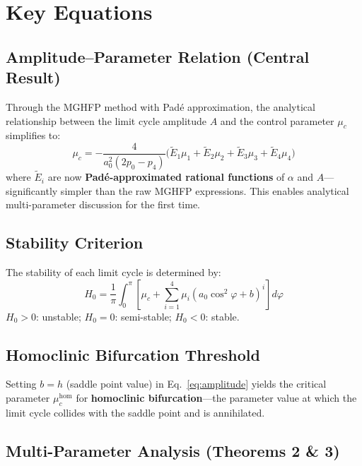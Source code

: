 \documentclass[11pt,a4paper]{article}
\begin{document}
\section{Key Equations}

\subsection{Amplitude--Parameter Relation (Central Result)}

Through the MGHFP method with Pad\'e approximation, the analytical relationship between the limit cycle amplitude $A$ and the control parameter $\mu_c$ simplifies to:
\begin{equation}
\boxed{\mu_c = -\frac{4}{a_0^2(2p_0 - p_4)}\Big(\tilde{E}_1\mu_1 + \tilde{E}_2\mu_2 + \tilde{E}_3\mu_3 + \tilde{E}_4\mu_4\Big)}
\label{eq:amplitude}
\end{equation}
where $\tilde{E}_i$ are now \textbf{Pad\'e-approximated rational functions} of $\alpha$ and $A$---significantly simpler than the raw MGHFP expressions. This enables analytical multi-parameter discussion for the first time.

\subsection{Stability Criterion}

The stability of each limit cycle is determined by:
\begin{equation}
\boxed{H_0 = \frac{1}{\pi}\int_0^\pi \left[\mu_c + \sum_{i=1}^{4}\mu_i(a_0\cos^2\varphi + b)^i\right]d\varphi}
\label{eq:stability}
\end{equation}
$H_0 > 0$: unstable; $H_0 = 0$: semi-stable; $H_0 < 0$: stable.

\subsection{Homoclinic Bifurcation Threshold}

Setting $b = h$ (saddle point value) in Eq.~\eqref{eq:amplitude} yields the critical parameter $\mu_c^{\mathrm{hom}}$ for \textbf{homoclinic bifurcation}---the parameter value at which the limit cycle collides with the saddle point and is annihilated.

\subsection{Multi-Parameter Analysis (Theorems 2 \& 3)}
\end{document}
